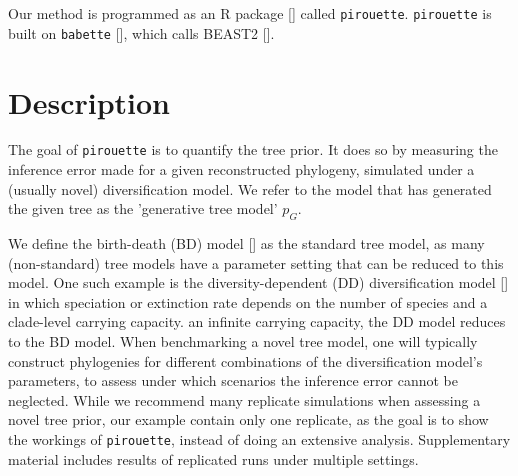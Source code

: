 Our method is programmed as an R package [\cite{R}] called \verb;pirouette;.
\verb;pirouette; is built on \verb;babette; [\cite{bilderbeek2018babette}], 
which calls BEAST2 [\cite{bouckaert2019beast}]. 

\section{Description}

The goal of \verb;pirouette; is to quantify the  tree prior.
It does so by measuring the inference error made 
for a given reconstructed phylogeny, 
simulated under a (usually novel) diversification model.
We refer to the model that has generated the given tree 
as the 'generative tree model' $\mathit{p_{G}}$.


We define the birth-death (BD) model [\cite{nee1994reconstructed}] as
the standard tree model, as many (non-standard) tree models 
have a parameter setting that can be reduced to this model. 
One such example is the diversity-dependent (DD) diversification 
model [\cite{DDD, etienne2012diversity}] in which speciation 
or extinction rate depends 
on the number of species and a clade-level carrying capacity.
an infinite carrying capacity, the DD model reduces to the BD model.
When benchmarking a novel tree model, 
one will typically construct phylogenies 
for different combinations of the diversification model's parameters, 
to assess under which scenarios the inference error cannot be neglected. 
While we recommend many replicate simulations 
when assessing a novel tree prior, 
our example contain only one replicate,
as the goal is to show the workings of \verb;pirouette;,
instead of doing an extensive analysis.
Supplementary material includes results of replicated runs under multiple settings.


